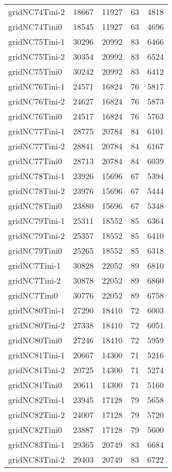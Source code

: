\begin{longtable}{lrrrr}
gridNC74Tini-2 & 18667 & 11927 & 63 & 4818 \\
gridNC74Tini0 & 18545 & 11927 & 63 & 4696 \\
gridNC75Tini-1 & 30296 & 20992 & 83 & 6466 \\
gridNC75Tini-2 & 30354 & 20992 & 83 & 6524 \\
gridNC75Tini0 & 30242 & 20992 & 83 & 6412 \\
gridNC76Tini-1 & 24571 & 16824 & 76 & 5817 \\
gridNC76Tini-2 & 24627 & 16824 & 76 & 5873 \\
gridNC76Tini0 & 24517 & 16824 & 76 & 5763 \\
gridNC77Tini-1 & 28775 & 20784 & 84 & 6101 \\
gridNC77Tini-2 & 28841 & 20784 & 84 & 6167 \\
gridNC77Tini0 & 28713 & 20784 & 84 & 6039 \\
gridNC78Tini-1 & 23926 & 15696 & 67 & 5394 \\
gridNC78Tini-2 & 23976 & 15696 & 67 & 5444 \\
gridNC78Tini0 & 23880 & 15696 & 67 & 5348 \\
gridNC79Tini-1 & 25311 & 18552 & 85 & 6364 \\
gridNC79Tini-2 & 25357 & 18552 & 85 & 6410 \\
gridNC79Tini0 & 25265 & 18552 & 85 & 6318 \\
gridNC7Tini-1 & 30828 & 22052 & 89 & 6810 \\
gridNC7Tini-2 & 30878 & 22052 & 89 & 6860 \\
gridNC7Tini0 & 30776 & 22052 & 89 & 6758 \\
gridNC80Tini-1 & 27290 & 18410 & 72 & 6003 \\
gridNC80Tini-2 & 27338 & 18410 & 72 & 6051 \\
gridNC80Tini0 & 27246 & 18410 & 72 & 5959 \\
gridNC81Tini-1 & 20667 & 14300 & 71 & 5216 \\
gridNC81Tini-2 & 20725 & 14300 & 71 & 5274 \\
gridNC81Tini0 & 20611 & 14300 & 71 & 5160 \\
gridNC82Tini-1 & 23945 & 17128 & 79 & 5658 \\
gridNC82Tini-2 & 24007 & 17128 & 79 & 5720 \\
gridNC82Tini0 & 23887 & 17128 & 79 & 5600 \\
gridNC83Tini-1 & 29365 & 20749 & 83 & 6684 \\
gridNC83Tini-2 & 29403 & 20749 & 83 & 6722 \\

\end{longtable}
